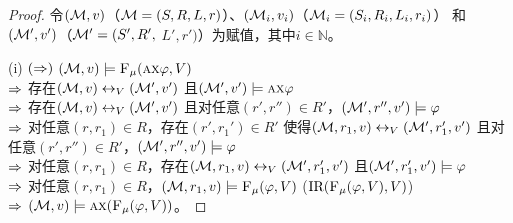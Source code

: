 \begin{proof}
	令$({\cal M},v)$（${\cal M}=(S,R, L, r)$）、$({\cal M}_i, v_i)$（${\cal M}_i = (S_i, R_i, L_i, r_i)$） 和$({\cal M}',v')$（${\cal M}'=(S', R',$ $L', r')$）为赋值，其中$i\in \mathbb{N}$。
	
	(i) 
	$(\Rightarrow)$ $({\cal M},v) \models {\textsc{F}_{\textsc{$\mu$}}}(\textsc{a}\textsc{x} \varphi, V)$\\
	$\Rightarrow$ 存在$({\cal M},v) \leftrightarrow_V ({\cal M}', v')$ 且$({\cal M}', v') \models \textsc{a}\textsc{x} \varphi$\\
	$\Rightarrow$ 存在$({\cal M},v) \leftrightarrow_V ({\cal M}', v')$ 且对任意$(r', r'') \in R'$，$({\cal M}',r'', v') \models \varphi$\\
	$\Rightarrow$ 对任意$(r,r_1)\in R$，存在$(r', r_1') \in R'$ 使得$({\cal M},r_1, v) \leftrightarrow_V ({\cal M}',r_1',v')$ 且对任意$(r', r'') \in R'$，$({\cal M}',r'', v') \models \varphi$\\
	$\Rightarrow$ 对任意$(r,r_1)\in R$，存在$({\cal M},r_1, v) \leftrightarrow_V ({\cal M}',r_1',v')$ 且$({\cal M}',r_1',v') \models \varphi$\\
	$\Rightarrow$ 对任意$(r,r_1)\in R$，$({\cal M},r_1, v) \models {\textsc{F}_{\textsc{$\mu$}}}(\varphi,V)$ \hfill ($\textrm{IR}({\textsc{F}_{\textsc{$\mu$}}}(\varphi,V), V)$)\\
	$\Rightarrow$ $({\cal M},v)\models \textsc{a} \textsc{x} ({\textsc{F}_{\textsc{$\mu$}}}(\varphi,V))$。
	

\end{proof}
